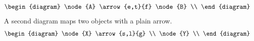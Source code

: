 \documentclass{article}
\begin{document}
\[
\begin{diagram}
\node{A} \arrow{e,t}{f} \node{B} \\
\end{diagram}
\]
A second diagram maps two objects with a plain arrow.
\[
\begin{diagram}
\node{X} \arrow{s,l}{g} \\ \node{Y} \\
\end{diagram}
\]
\end{document}
